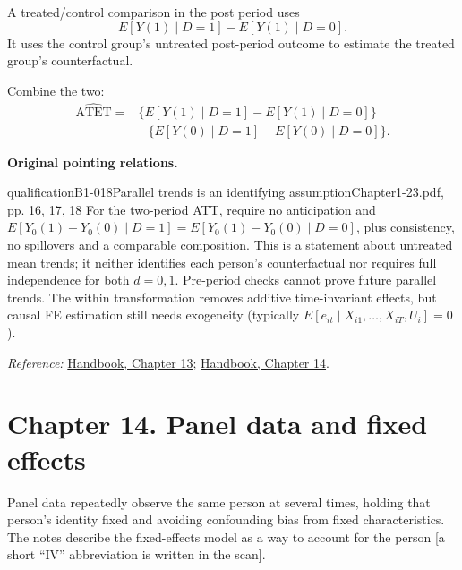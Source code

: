 {A treated/control comparison in the post period uses
\[E[Y(1)\mid D=1]-E[Y(1)\mid D=0].\]
It uses the control group's untreated post-period outcome to estimate the treated group's counterfactual. 

Combine the two:
\begin{align*}
\widehat{\mathrm{ATET}}={}&\{E[Y(1)\mid D=1]-E[Y(1)\mid D=0]\}\\
&-\{E[Y(0)\mid D=1]-E[Y(0)\mid D=0]\}.
\end{align*}

\par{}\smallskip\textbf{Original pointing relations.}\par\smallskip
{}
\begin{reviewnote}{qualification}{B1-018}{Parallel trends is an identifying assumption}{Chapter1-23.pdf, pp. 16, 17, 18}
For the two-period ATT, require no anticipation and $E[Y_0(1)-Y_0(0)\mid D=1]=E[Y_0(1)-Y_0(0)\mid D=0]$, plus consistency, no spillovers and a comparable composition. This is a statement about untreated mean trends; it neither identifies each person's counterfactual nor requires full independence for both $d=0,1$. Pre-period checks cannot prove future parallel trends. The within transformation removes additive time-invariant effects, but causal FE estimation still needs exogeneity (typically $E[e_{it}\mid X_{i1},\ldots,X_{iT},U_i]=0$).
\par\smallskip\textit{Reference:} \href{https://matheusfacure.github.io/python-causality-handbook/13-Difference-in-Differences.html}{Handbook, Chapter 13}; \href{https://matheusfacure.github.io/python-causality-handbook/14-Panel-Data-and-Fixed-Effects.html}{Handbook, Chapter 14}.
\end{reviewnote}
\section{Chapter 14. Panel data and fixed effects}
Panel data repeatedly observe the same person at several times, holding that person's identity fixed and avoiding confounding bias from fixed characteristics. The notes describe the fixed-effects model as a way to account for the person [a short ``IV'' abbreviation is written in the scan].

}
